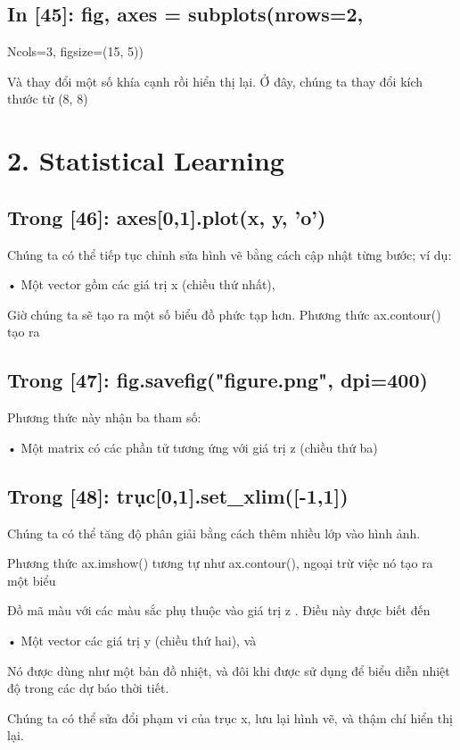 \subsection{In [45]: fig, axes = subplots(nrows=2,}

Ncols=3, figsize=(15, 5))

Và thay đổi một số khía cạnh rồi hiển thị lại. Ở đây, chúng ta thay đổi kích thước từ (8, 8)

\section{2. Statistical Learning}

\subsection{Trong [46]: axes[0,1].plot(x, y, 'o')}

Chúng ta có thể tiếp tục chỉnh sửa hình vẽ bằng cách cập nhật từng bước; ví dụ:

• Một vector gồm các giá trị x (chiều thứ nhất),

Giờ chúng ta sẽ tạo ra một số biểu đồ phức tạp hơn. Phương thức ax.contour() tạo ra

\subsection{Trong [47]: fig.savefig("figure.png", dpi=400)}

Phương thức này nhận ba tham số:

• Một matrix có các phần tử tương ứng với giá trị z (chiều thứ ba)

\subsection{Trong [48]: trục[0,1].set\_xlim([-1,1])}

Chúng ta có thể tăng độ phân giải bằng cách thêm nhiều lớp vào hình ảnh.

Phương thức ax.imshow() tương tự như ax.contour(), ngoại trừ việc nó tạo ra một biểu

Đồ mã màu với các màu sắc phụ thuộc vào giá trị z . Điều này được biết đến

• Một vector các giá trị y (chiều thứ hai), và

Nó được dùng như một bản đồ nhiệt, và đôi khi được sử dụng để biểu diễn nhiệt độ trong các dự báo thời tiết.

Chúng ta có thể sửa đổi phạm vi của trục x, lưu lại hình vẽ, và thậm chí hiển thị lại.

